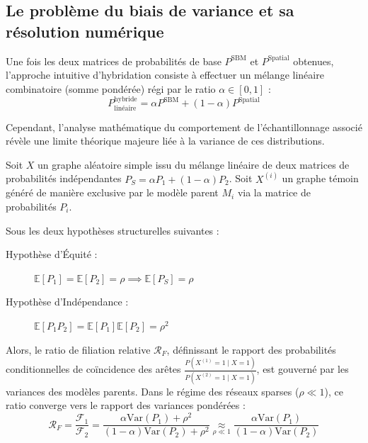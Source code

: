 \subsection{Le problème du biais de variance et sa résolution numérique}

Une fois les deux matrices de probabilités de base $P^{\text{SBM}}$ et $P^{\text{Spatial}}$ obtenues, l'approche intuitive d'hybridation consiste à effectuer un mélange linéaire combinatoire (somme pondérée) régi par le ratio  $\alpha \in [0, 1]$ :
\begin{equation}
    P^{\text{hybride}}_{\text{linéaire}} = \alpha P^{\text{SBM}} + (1-\alpha) P^{\text{Spatial}}
\end{equation}

Cependant, l'analyse mathématique du comportement de l'échantillonnage associé révèle une limite théorique majeure liée à la variance de ces distributions.

\begin{theorem}
Soit $X$ un graphe aléatoire simple issu du mélange linéaire de deux matrices de probabilités indépendantes $P_S = \alpha P_1 + (1-\alpha) P_2$. Soit $X^{(i)}$ un graphe témoin généré de manière exclusive par le modèle parent $M_i$ via la matrice de probabilités $P_i$. 

Sous les deux hypothèses structurelles suivantes :
\begin{description}
    \item[Hypothèse d'Équité :] $\mathbb{E}[P_1] = \mathbb{E}[P_2] = \rho \implies \mathbb{E}[P_S] = \rho$
    \item[Hypothèse d'Indépendance :] $\mathbb{E}[P_1 P_2] = \mathbb{E}[P_1]\mathbb{E}[P_2] = \rho^2$
\end{description}

Alors, le ratio de filiation relative $\mathcal{R}_F$, définissant le rapport des probabilités conditionnelles de coïncidence des arêtes $\frac{P(X^{(1)} = 1 \mid X = 1)}{P(X^{(2)} = 1 \mid X = 1)}$, est gouverné par les variances des modèles parents. Dans le régime des réseaux sparses ($\rho \ll 1$), ce ratio converge vers le rapport des variances pondérées :
\begin{equation}
    \mathcal{R}_F = \frac{\mathcal{F}_1}{\mathcal{F}_2} = \frac{\alpha \text{Var}(P_1) + \rho^2}{(1-\alpha) \text{Var}(P_2) + \rho^2} \underset{\rho \ll 1}{\approx} \frac{\alpha \text{Var}(P_1)}{(1-\alpha) \text{Var}(P_2)}
\end{equation}
\end{theorem}

